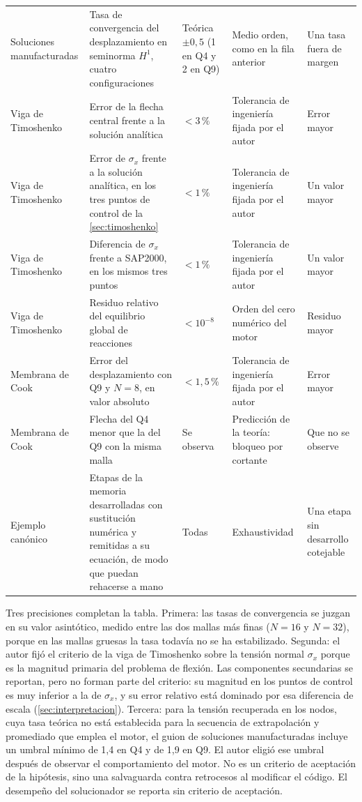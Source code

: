 {\begin{longtable}{@{}>{\raggedright\arraybackslash}p{2.3cm}>{\raggedright\arraybackslash}p{3.6cm}>{\raggedright\arraybackslash}p{2.6cm}>{\raggedright\arraybackslash}p{3.0cm}>{\raggedright\arraybackslash}p{2.3cm}@{}}
Soluciones manufacturadas & Tasa de convergencia del desplazamiento en seminorma $H^1$, cuatro configuraciones & Teórica $\pm 0{,}5$ (1 en Q4 y 2 en Q9) & Medio orden, como en la fila anterior & Una tasa fuera de margen \\
Viga de Timoshenko & Error de la flecha central frente a la solución analítica & $< 3\,\%$ & Tolerancia de ingeniería fijada por el autor & Error mayor \\
Viga de Timoshenko & Error de $\sigma_x$ frente a la solución analítica, en los tres puntos de control de la \autoref{sec:timoshenko} & $< 1\,\%$ & Tolerancia de ingeniería fijada por el autor & Un valor mayor \\
Viga de Timoshenko & Diferencia de $\sigma_x$ frente a SAP2000, en los mismos tres puntos & $< 1\,\%$ & Tolerancia de ingeniería fijada por el autor & Un valor mayor \\
Viga de Timoshenko & Residuo relativo del equilibrio global de reacciones & $< 10^{-8}$ & Orden del cero numérico del motor & Residuo mayor \\
Membrana de Cook & Error del desplazamiento con Q9 y $N=8$, en valor absoluto & $< 1{,}5\,\%$ & Tolerancia de ingeniería fijada por el autor & Error mayor \\
Membrana de Cook & Flecha del Q4 menor que la del Q9 con la misma malla & Se observa & Predicción de la teoría: bloqueo por cortante & Que no se observe \\
Ejemplo canónico & Etapas de la memoria desarrolladas con sustitución numérica y remitidas a su ecuación, de modo que puedan rehacerse a mano & Todas & Exhaustividad & Una etapa sin desarrollo cotejable \\
\end{longtable}}

Tres precisiones completan la tabla. Primera: las tasas de convergencia se juzgan en su valor asintótico, medido entre las dos mallas más finas ($N=16$ y $N=32$), porque en las mallas gruesas la tasa todavía no se ha estabilizado. Segunda: el autor fijó el criterio de la viga de Timoshenko sobre la tensión normal $\sigma_x$ porque es la magnitud primaria del problema de flexión. Las componentes secundarias se reportan, pero no forman parte del criterio: su magnitud en los puntos de control es muy inferior a la de $\sigma_x$, y su error relativo está dominado por esa diferencia de escala (\autoref{sec:interpretacion}). Tercera: para la tensión recuperada en los nodos, cuya tasa teórica no está establecida para la secuencia de extrapolación y promediado que emplea el motor, el guion de soluciones manufacturadas incluye un umbral mínimo de 1,4 en Q4 y de 1,9 en Q9. El autor eligió ese umbral después de observar el comportamiento del motor. No es un criterio de aceptación de la hipótesis, sino una salvaguarda contra retrocesos al modificar el código. El desempeño del solucionador se reporta sin criterio de aceptación.

